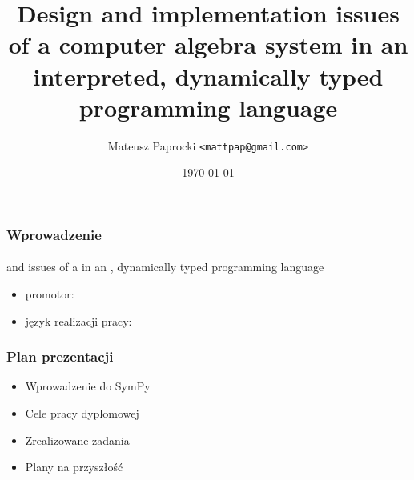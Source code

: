 \documentclass{beamer}
\title{
    Design and implementation issues \linebreak
    of a computer algebra system \linebreak
    in an interpreted, dynamically typed \linebreak
    programming language
}
\author{Mateusz Paprocki \texttt{<mattpap@gmail.com>}}
\institute[PWR]{Wrocław University of Technology}
\date{\today}
\begin{document}
\begin{frame}[plain,t]
    \maketitle
\end{frame}

\begin{frame}
    \frametitle{Wprowadzenie}
    \framesubtitle{}

    \begin{center}
         and  issues \linebreak
        of a  \linebreak
        in an , dynamically typed \linebreak
        programming language
    \end{center}

    \begin{itemize}
        \item promotor: 
        \item język realizacji pracy: 
    \end{itemize}
\end{frame}

\begin{frame}
    \frametitle{Plan prezentacji}

    \begin{itemize}
        \item Wprowadzenie do SymPy
        \item Cele pracy dyplomowej
        \item Zrealizowane zadania
        \item Plany na przyszłość
    \end{itemize}
\end{frame}
\end{document}
